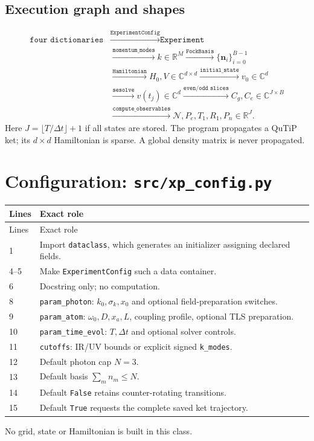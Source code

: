 \documentclass[11pt,a4paper]{article}
\newcommand{\code}[1]{\nolinkurl{#1}}
\begin{document}
\subsection{Execution graph and shapes}
\begin{align*}
\texttt{four dictionaries}
&\xrightarrow{\texttt{ExperimentConfig}}
\texttt{Experiment}\\
&\xrightarrow{\texttt{momentum\_modes}}k\in\mathbb R^M
\xrightarrow{\texttt{FockBasis}}\{\mathbf n_i\}_{i=0}^{B-1}\\
&\xrightarrow{\texttt{Hamiltonian}}H_0,V\in\mathbb C^{d\times d}
\xrightarrow{\texttt{initial\_state}}v_0\in\mathbb C^d\\
&\xrightarrow{\texttt{sesolve}}v(t_j)\in\mathbb C^d
\xrightarrow{\texttt{even/odd slices}}C_g,C_e\in\mathbb C^{J\times B}\\
&\xrightarrow{\texttt{compute\_observables}}
\mathcal N,P_e,T_1,R_1,P_n\in\mathbb R^J.
\end{align*}
Here $J=\lfloor T/\Delta t\rfloor+1$ if all states are stored. The program
propagates a QuTiP ket; its $d\times d$ Hamiltonian is sparse. A global
density matrix is never propagated.

\section{Configuration: \code{src/xp_config.py}}

\begin{longtable}{p{}p{}}
\toprule Lines & Exact role\\\midrule\endfirsthead
\toprule Lines & Exact role\\\midrule\endhead
1 & Import \code{dataclass}, which generates an initializer assigning declared fields.\\
4--5 & Make \code{ExperimentConfig} such a data container.\\
6 & Docstring only; no computation.\\
8 & \code{param_photon}: $k_0,\sigma_k,x_0$ and optional field-preparation switches.\\
9 & \code{param_atom}: $\omega_0,D,x_a,L$, coupling profile, optional TLS preparation.\\
10 & \code{param_time_evol}: $T,\Delta t$ and optional solver controls.\\
11 & \code{cutoffs}: IR/UV bounds or explicit signed \code{k_modes}.\\
12 & Default photon cap $N=3$.\\
13 & Default basis $\sum_mn_m\leq N$.\\
14 & Default \code{False} retains counter-rotating transitions.\\
15 & Default \code{True} requests the complete saved ket trajectory.\\
\bottomrule
\end{longtable}
No grid, state or Hamiltonian is built in this class.
\end{document}
